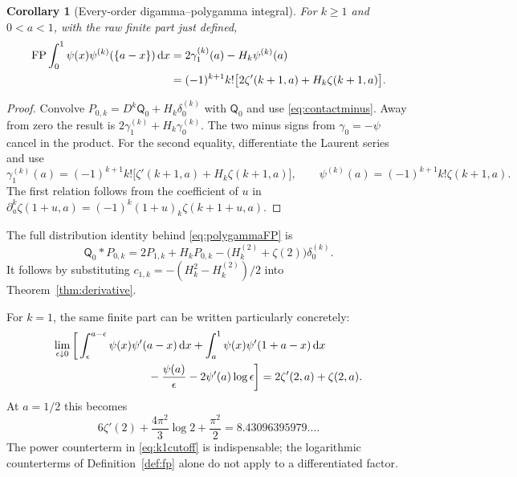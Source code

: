 \documentclass[11pt]{article}
\numberwithin{equation}{section}
\newtheorem{corollary}[theorem]{Corollary}
\theoremstyle{definition}\newtheorem{definition}[theorem]{Definition}
\theoremstyle{remark}\newtheorem{remark}[theorem]{Remark}
\DeclareMathOperator{\FP}{FP}
\newcommand{\dd}{\,\mathrm d}
\newcommand{\qn}[1]{\mathsf Q_{#1}}
\begin{document}
\begin{corollary}[Every-order digamma--polygamma integral]
\label{cor:polygamma}
For $k\ge1$ and $0<a<1$, with the raw finite part just defined,
\begin{align}\label{eq:polygammaFP}
 \FP\int_0^1\psi(x)\psi^{(k)}(\{a-x\})\dd x
 &=2\gamma_1^{(k)}(a)-H_k\psi^{(k)}(a)\notag\\
 &=(-1)^{k+1}k!
       \bigl[2\zeta'(k+1,a)+H_k\zeta(k+1,a)\bigr].
\end{align}
\end{corollary}
\begin{proof}
Convolve $P_{0,k}=D^k\qn0+H_k\delta_0^{(k)}$ with $\qn0$ and use
\eqref{eq:contactminus}. Away from zero the result is
$2\gamma_1^{(k)}+H_k\gamma_0^{(k)}$.
The two minus signs from $\gamma_0=-\psi$ cancel in the product.
For the second equality, differentiate the Laurent series and use
\begin{equation}\label{eq:harmonicmaster}
 \gamma_1^{(k)}(a)=(-1)^{k+1}k!
       \bigl[\zeta'(k+1,a)+H_k\zeta(k+1,a)\bigr],\qquad
 \psi^{(k)}(a)=(-1)^{k+1}k!\zeta(k+1,a).
\end{equation}
The first relation follows from the coefficient of $u$ in
$\partial_a^k\zeta(1+u,a)=(-1)^k(1+u)_k\zeta(k+1+u,a)$.
\end{proof}

The full distribution identity behind \eqref{eq:polygammaFP} is
\begin{equation}\label{eq:globalpolygamma}
 \qn0*P_{0,k}=2P_{1,k}+H_kP_{0,k}
                 -\bigl(H_k^{(2)}+\zeta(2)\bigr)\delta_0^{(k)}.
\end{equation}
It follows by substituting
$c_{1,k}=-(H_k^2-H_k^{(2)})/2$ into Theorem~\ref{thm:derivative}.

For $k=1$, the same finite part can be written particularly concretely:
\begin{align}\label{eq:k1cutoff}
 \lim_{\epsilon\downarrow0}\bigg[&
 \int_\epsilon^{a-\epsilon}\psi(x)\psi'(a-x)\dd x
 +\int_a^1\psi(x)\psi'(1+a-x)\dd x\notag\\
 &\hspace{22mm}-\frac{\psi(a)}\epsilon
                   -2\psi'(a)\log\epsilon\bigg]
       =2\zeta'(2,a)+\zeta(2,a).
\end{align}
At $a=1/2$ this becomes
\begin{equation}\label{eq:polygammahalf}
 6\zeta'(2)+\frac{4\pi^2}{3}\log2+\frac{\pi^2}{2}
                 =8.43096395979\ldots.
\end{equation}
The power counterterm in \eqref{eq:k1cutoff} is indispensable; the
logarithmic counterterms of Definition~\ref{def:fp} alone do not apply to
a differentiated factor.
\end{document}
